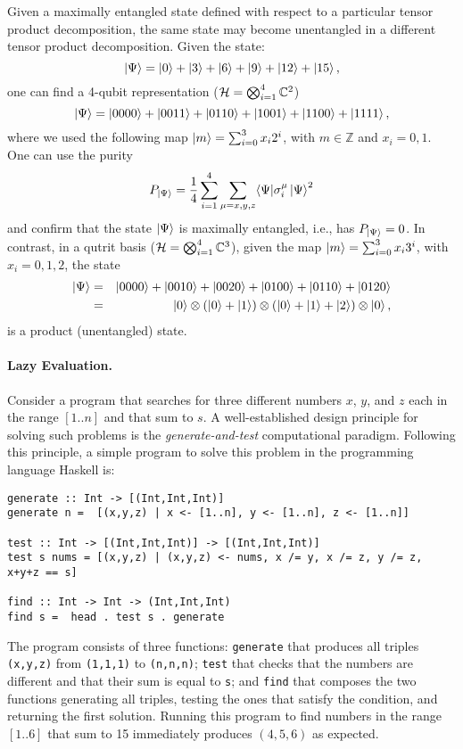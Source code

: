 \documentclass{article}
\newcommand{\h}[1]{\texttt{#1}}
\begin{document}
\begin{refsection}
Given a maximally entangled state defined with respect to a particular
tensor product decomposition, the same state may become unentangled in
a different tensor product decomposition. Given the state:
\[
 \ket{\Psi} =\ket{0}+\ket{3}+\ket{6}+\ket{9}+\ket{12}+\ket{15},
\]
one can find a 4-qubit representation (${\cal H}=\bigotimes_{i=1}^4
\mathbb{C}^2$)
\[
 \ket{\Psi} = \ket{0000}+\ket{0011}+\ket{0110} 
  + \ket{1001}+\ket{1100}+\ket{1111},
\]
where we used the following map $\ket{m}=\sum_{i=0}^3 x_i 2^i$, with
$m \in \mathbb{Z}$ and $x_i=0,1$.  One can use the purity~\cite{GE2004}
\[
 P_{\ket{\Psi} }=\frac{1}{4}\sum_{i=1}^4\sum_{\mu=x,y,z}\langle \Psi |
 \sigma^\mu_i \ket{\Psi}^2
\]
and confirm that the state $\ket{\Psi}$ is maximally entangled, i.e.,
has $P_{\ket{\Psi}} =0$. In contrast, in a qutrit basis (${\cal
  H}=\bigotimes_{i=1}^4 \mathbb{C}^3$), given the map
$\ket{m}=\sum_{i=0}^3 x_i 3^i$, with $x_i=0,1,2$, the state
\begin{eqnarray}
 \ket{\Psi} &=&\ket{0000}+\ket{0010}+\ket{0020} 
  + \ket{0100}+\ket{0110}+\ket{0120} \nonumber \\
 &=&\ket{0}\otimes(\ket{0}+\ket{1})\otimes(\ket{0}+\ket{1}+\ket{2})\otimes\ket{0}, \nonumber
\end{eqnarray}
is a product (unentangled) state. 

\paragraph*{Lazy Evaluation.}
Consider a program that searches for three different numbers $x$, $y$,
and $z$ each in the range $[1..n]$ and that sum to $s$. A
well-established design principle for solving such problems is the
\emph{generate-and-test} computational paradigm. Following this
principle, a simple program to solve this problem in the programming
language Haskell is:

\begin{verbatim}
generate :: Int -> [(Int,Int,Int)]
generate n =  [(x,y,z) | x <- [1..n], y <- [1..n], z <- [1..n]]

test :: Int -> [(Int,Int,Int)] -> [(Int,Int,Int)]
test s nums = [(x,y,z) | (x,y,z) <- nums, x /= y, x /= z, y /= z, x+y+z == s]

find :: Int -> Int -> (Int,Int,Int)
find s =  head . test s . generate
\end{verbatim}

\noindent The program consists of three functions: \h{generate} that
produces all triples \h{(x,y,z)} from \h{(1,1,1)} to \h{(n,n,n)};
\h{test} that checks that the numbers are different and that their sum
is equal to \h{s}; and \h{find} that composes the two functions
generating all triples, testing the ones that satisfy the condition,
and returning the first solution. Running this program to find numbers
in the range $[1..6]$ that sum to 15 immediately produces $(4,5,6)$ as
expected.


\end{refsection}
\end{document}
